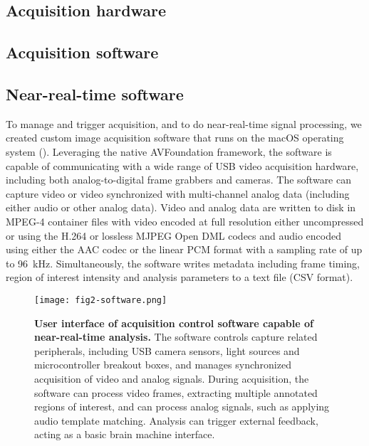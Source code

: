 \subsection{Acquisition hardware}


\subsection{Acquisition software}


\subsection{Near-real-time software}

To manage and trigger acquisition, and to do near-real-time signal
processing, we created custom image acquisition software that runs
on the macOS operating system (). Leveraging the 
native AVFoundation
framework, the software is capable of communicating with a wide 
range of USB video 
acquisition hardware, including both analog-to-digital frame 
grabbers and cameras. The software can capture video or video 
synchronized with multi-channel analog data (including 
either audio or other analog data). Video and analog data are 
written to disk in MPEG-4 container files with video encoded at 
full resolution either uncompressed or using the H.264 or lossless 
MJPEG Open DML codecs and audio encoded using either the AAC codec 
or the linear PCM format with a sampling rate of up to 
96~\si{\kilo\hertz}. Simultaneously, the software writes metadata 
including frame timing, region of interest intensity and analysis  
parameters to a text file (CSV format).

\begin{figure}
\texttt{[image: fig2-software.png]}
\caption[Software for capture near-real-time analysis]{\textbf{User interface of acquisition
control software capable of near-real-time analysis.} The software 
controls capture related peripherals, including USB camera sensors,
light sources and microcontroller breakout boxes, and manages 
synchronized acquisition of video and analog signals. During 
acquisition, the software can process video frames, extracting 
multiple annotated regions of interest, and can process analog 
signals, such as applying audio template matching. Analysis 
can trigger external feedback, acting as a basic brain machine 
interface.}
\label{fig:software}
\end{figure}


